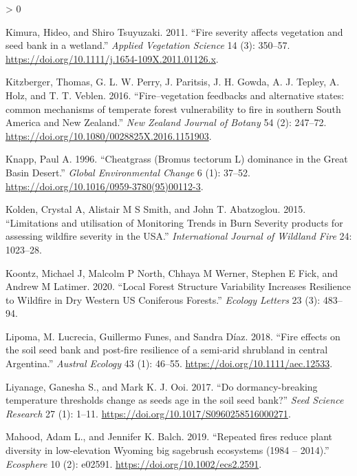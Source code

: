 \documentclass[
  12pt,
]{article}
\newlength{\cslhangindent}
\newenvironment{CSLReferences}[2] %
 {%
  \setlength{\parindent}{0pt}
  \ifodd #1 \everypar{\setlength{\hangindent}{\cslhangindent}}\ignorespaces\fi
  \ifnum #2 > 0
  \setlength{\parskip}{#2\baselineskip}
  \fi
 }%
 {}
\begin{document}
\begin{CSLReferences}{1}{0}
\leavevmode\hypertarget{ref-Kimura2011}{}%
Kimura, Hideo, and Shiro Tsuyuzaki. 2011. {``{Fire severity affects
vegetation and seed bank in a wetland}.''} \emph{Applied Vegetation
Science} 14 (3): 350--57.
\url{https://doi.org/10.1111/j.1654-109X.2011.01126.x}.

\leavevmode\hypertarget{ref-Kitzberger2016}{}%
Kitzberger, Thomas, G. L. W. Perry, J. Paritsis, J. H. Gowda, A. J.
Tepley, A. Holz, and T. T. Veblen. 2016. {``{Fire--vegetation feedbacks
and alternative states: common mechanisms of temperate forest
vulnerability to fire in southern South America and New Zealand}.''}
\emph{New Zealand Journal of Botany} 54 (2): 247--72.
\url{https://doi.org/10.1080/0028825X.2016.1151903}.

\leavevmode\hypertarget{ref-Knapp1996}{}%
Knapp, Paul A. 1996. {``{Cheatgrass (Bromus tectorum L) dominance in the
Great Basin Desert}.''} \emph{Global Environmental Change} 6 (1):
37--52. \url{https://doi.org/10.1016/0959-3780(95)00112-3}.

\leavevmode\hypertarget{ref-Kolden2015}{}%
Kolden, Crystal A, Alistair M S Smith, and John T. Abatzoglou. 2015.
{``{Limitations and utilisation of Monitoring Trends in Burn Severity
products for assessing wildfire severity in the USA}.''}
\emph{International Journal of Wildland Fire} 24: 1023--28.

\leavevmode\hypertarget{ref-Koontz2020}{}%
Koontz, Michael J, Malcolm P North, Chhaya M Werner, Stephen E Fick, and
Andrew M Latimer. 2020. {``Local Forest Structure Variability Increases
Resilience to Wildfire in Dry Western US Coniferous Forests.''}
\emph{Ecology Letters} 23 (3): 483--94.

\leavevmode\hypertarget{ref-Lipoma2018}{}%
Lipoma, M. Lucrecia, Guillermo Funes, and Sandra Díaz. 2018. {``{Fire
effects on the soil seed bank and post-fire resilience of a semi-arid
shrubland in central Argentina}.''} \emph{Austral Ecology} 43 (1):
46--55. \url{https://doi.org/10.1111/aec.12533}.

\leavevmode\hypertarget{ref-Liyanage2017}{}%
Liyanage, Ganesha S., and Mark K. J. Ooi. 2017. {``{Do dormancy-breaking
temperature thresholds change as seeds age in the soil seed bank?}''}
\emph{Seed Science Research} 27 (1): 1--11.
\url{https://doi.org/10.1017/S0960258516000271}.

\leavevmode\hypertarget{ref-Mahood2019}{}%
Mahood, Adam L., and Jennifer K. Balch. 2019. {``{Repeated fires reduce
plant diversity in low-elevation Wyoming big sagebrush ecosystems (1984
-- 2014)}.''} \emph{Ecosphere} 10 (2): e02591.
\url{https://doi.org/10.1002/ecs2.2591}.


\end{CSLReferences}
\end{document}
